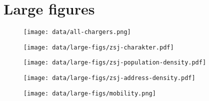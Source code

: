 \chapter{Large figures}



\begin{figure}
    \texttt{[image: data/all-chargers.png]}
    \caption{}{}
    \label{fig-large:all-chargers}
\end{figure}

\begin{figure}
    \texttt{[image: data/large-figs/zsj-charakter.pdf]}
    \caption{}{}
    \label{fig-large:zsj-character}
\end{figure}

\begin{figure}
    \texttt{[image: data/large-figs/zsj-population-density.pdf]}
    \caption{}{}
    \label{fig-large:zsj-population-density}
\end{figure}

\begin{figure}
    \texttt{[image: data/large-figs/zsj-address-density.pdf]}
    \caption{}{}
    \label{fig-large:zsj-address-density}
\end{figure}

\begin{figure}
    \texttt{[image: data/large-figs/mobility.png]}
    \caption{}{}
    \label{fig-large:people-mobility}
\end{figure}